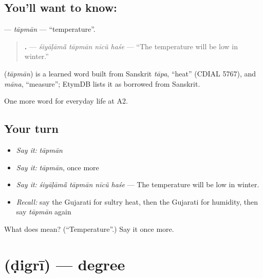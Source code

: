 \subsection*{You'll want to know: }
\textbf{} — \emph{tāpmān} — \textquotedblleft{}temperature\textquotedblright{}.

\begin{quote}
\textbf{   .} — \emph{śiyāḷāmā̃ tāpmān nīcũ haśe} — \textquotedblleft{}The temperature will be low in winter.\textquotedblright{}
\end{quote}

\begin{cousinweb}
\textbf{} (\emph{tāpmān}) is a learned word built from Sanskrit \emph{tāpa}, \textquotedblleft{}heat\textquotedblright{} (CDIAL 5767), and \emph{māna}, \textquotedblleft{}measure\textquotedblright{}; EtymDB lists it as borrowed from Sanskrit.
\end{cousinweb}

\begin{grammarlens}[title={What you've built}]
One more word for everyday life at A2.
\end{grammarlens}

\subsection*{Your turn}
\begin{itemize}
\raggedright
  \item \emph{Say it:} \emph{tāpmān}
  \item \emph{Say it:} \emph{tāpmān}, once more
  \item \emph{Say it:} \emph{śiyāḷāmā̃ tāpmān nīcũ haśe} — The temperature will be low in winter.
  \item \emph{Recall:} say the Gujarati for sultry heat, then the Gujarati for humidity, then say \emph{tāpmān} again
\end{itemize}

\begin{tcolorbox}[breakable,colback=teal!4,colframe=teal!35!black,title={Before you move on}]
What does  mean? (\textquotedblleft{}Temperature\textquotedblright{}.) Say it once more.
\end{tcolorbox}
\section[\texorpdfstring{\gu{ડિગ્રી} (ḍigrī)}{ડિગ્રી (ḍigrī)}]{ (ḍigrī) — degree}

